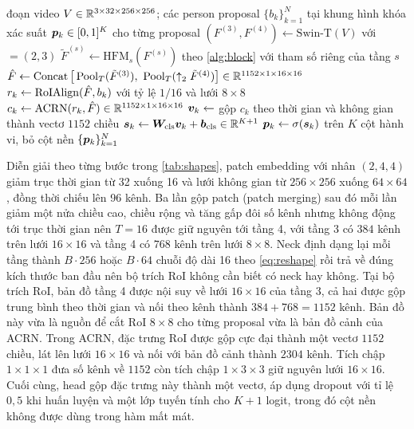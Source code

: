 \begin{algorithm}[htbp]
\caption{Lan truyền thuận của pipeline đầy đủ cho một đoạn video}
\label{alg:pipeline}
\begin{algorithmic}[1]
\Require đoạn video $V \in \mathbb{R}^{3 \times 32 \times 256 \times 256}$; các person proposal $\{b_k\}_{k=1}^{N}$ tại khung hình khóa
\Ensure xác suất $\bm{p}_k \in [0,1]^{K}$ cho từng proposal
\State $(F^{(3)}, F^{(4)}) \gets \text{Swin-T}(V)$ với  $= (2, 3)$
  \State $\tilde{F}^{(s)} \gets \text{HFM}_s(F^{(s)})$ theo \cref{alg:block} với tham số riêng của tầng $s$
\EndFor
\State $\hat{F} \gets \operatorname{Concat}\big[\operatorname{Pool}_T(\tilde{F}^{(3)}),\ \operatorname{Pool}_T(\uparrow_2 \tilde{F}^{(4)})\big] \in \mathbb{R}^{1152 \times 1 \times 16 \times 16}$
  \State $r_k \gets \operatorname{RoIAlign}(\hat{F}, b_k)$ với tỷ lệ $1/16$ và lưới $8 \times 8$ 
  \State $c_k \gets \mathrm{ACRN}(r_k, \hat{F}) \in \mathbb{R}^{1152 \times 1 \times 16 \times 16}$ 
  \State $\bm{v}_k \gets$ gộp $c_k$ theo thời gian và không gian thành vectơ $1152$ chiều
  \State $\bm{s}_k \gets \bm{W}_{\text{cls}}\bm{v}_k + \bm{b}_{\text{cls}} \in \mathbb{R}^{K+1}$
  \State $\bm{p}_k \gets \sigma(\bm{s}_k)$ trên $K$ cột hành vi, bỏ cột nền
\EndFor
\State \Return $\{\bm{p}_k\}_{k=1}^{N}$
\end{algorithmic}
\end{algorithm}

Diễn giải theo từng bước trong \cref{tab:shapes}, patch embedding với nhân $(2, 4, 4)$ giảm trục thời gian từ 32 xuống 16 và lưới không gian từ $256 \times 256$ xuống $64 \times 64$, đồng thời chiếu lên 96 kênh. Ba lần gộp patch (patch merging) sau đó mỗi lần giảm một nửa chiều cao, chiều rộng và tăng gấp đôi số kênh nhưng không động tới trục thời gian nên $T = 16$ được giữ nguyên tới tầng 4, với tầng 3 có $384$ kênh trên lưới $16 \times 16$ và tầng 4 có $768$ kênh trên lưới $8 \times 8$. Neck định dạng lại mỗi tầng thành $B \cdot 256$ hoặc $B \cdot 64$ chuỗi độ dài 16 theo \cref{eq:reshape} rồi trả về đúng kích thước ban đầu nên bộ trích RoI không cần biết có neck hay không. Tại bộ trích RoI, bản đồ tầng 4 được nội suy về lưới $16 \times 16$ của tầng 3, cả hai được gộp trung bình theo thời gian và nối theo kênh thành $384 + 768 = 1152$ kênh. Bản đồ này vừa là nguồn để cắt RoI $8 \times 8$ cho từng proposal vừa là bản đồ cảnh của ACRN. Trong ACRN, đặc trưng RoI được gộp cực đại thành một vectơ $1152$ chiều, lát lên lưới $16 \times 16$ và nối với bản đồ cảnh thành $2304$ kênh. Tích chập $1 \times 1 \times 1$ đưa số kênh về $1152$ còn tích chập $1 \times 3 \times 3$ giữ nguyên lưới $16 \times 16$. Cuối cùng, head gộp đặc trưng này thành một vectơ, áp dụng dropout với tỉ lệ $0{,}5$ khi huấn luyện và một lớp tuyến tính cho $K + 1$ logit, trong đó cột nền không được dùng trong hàm mất mát.

